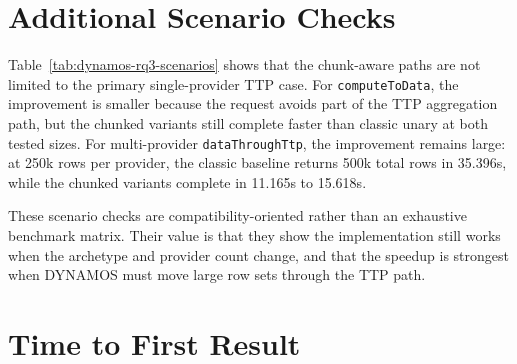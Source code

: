 \section{Additional Scenario Checks}

\begin{table}[!htbp]
    \centering
    \scriptsize
    \caption{Focused DYNAMOS scenario checks beyond the primary single-provider \texttt{dataThroughTtp} benchmark.}
    \label{tab:dynamos-rq3-scenarios}
    \setlength{\tabcolsep}{3pt}
\end{table}

Table~\ref{tab:dynamos-rq3-scenarios} shows that the chunk-aware paths are not limited to the primary single-provider TTP case. For \texttt{computeToData}, the improvement is smaller because the request avoids part of the TTP aggregation path, but the chunked variants still complete faster than classic unary at both tested sizes. For multi-provider \texttt{dataThroughTtp}, the improvement remains large: at 250k rows per provider, the classic baseline returns 500k total rows in 35.396s, while the chunked variants complete in 11.165s to 15.618s.

These scenario checks are compatibility-oriented rather than an exhaustive benchmark matrix. Their value is that they show the implementation still works when the archetype and provider count change, and that the speedup is strongest when DYNAMOS must move large row sets through the TTP path.

\section{Time to First Result}

